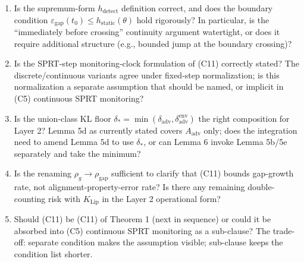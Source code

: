 \documentclass{article}
\newcommand{\Aadv}{A_{\mathrm{adv}}}
\newcommand{\deltaadv}{\delta_{\mathrm{adv}}}
\newcommand{\deltastar}{\delta_{*}}
\newcommand{\rhogap}{\rho_{\mathrm{gap}}}
\newcommand{\epsgap}{\varepsilon_{\mathrm{gap}}}
\begin{document}
\begin{enumerate}
\item Is the supremum-form $h_{\mathrm{detect}}$ definition
  correct, and does the boundary condition $\epsgap(t_0) \leq
  h_{\mathrm{static}}(\theta)$ hold rigorously?  In particular, is
  the ``immediately before crossing'' continuity argument
  watertight, or does it require additional structure (e.g.,
  bounded jump at the boundary crossing)?

\item Is the SPRT-step monitoring-clock formulation of (C11)
  correctly stated?  The discrete/continuous variants agree under
  fixed-step normalization; is this normalization a separate
  assumption that should be named, or implicit in (C5) continuous
  SPRT monitoring?

\item Is the union-class KL floor $\deltastar = \min(\deltaadv,
  \delta_{\mathrm{adv}}^{\mathrm{env}})$ the right composition for
  Layer 2?  Lemma 5d as currently stated covers $\Aadv$ only;
  does the integration need to amend Lemma 5d to use $\deltastar$,
  or can Lemma 6 invoke Lemma 5b/5e separately and take the
  minimum?

\item Is the renaming $\rho_g \to \rhogap$ sufficient to clarify
  that (C11) bounds gap-growth rate, not alignment-property-error
  rate?  Is there any remaining double-counting risk with
  $K_{\mathrm{Lip}}$ in the Layer 2 operational form?

\item Should (C11) be (C11) of Theorem 1 (next in sequence) or
  could it be absorbed into (C5) continuous SPRT monitoring as a
  sub-clause?  The trade-off: separate condition makes the
  assumption visible; sub-clause keeps the condition list shorter.
\end{enumerate}
\end{document}
